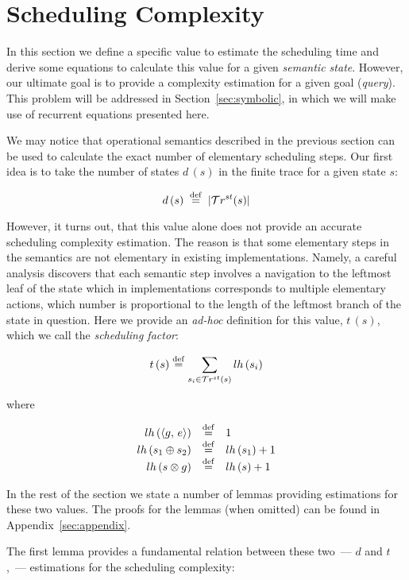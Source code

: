 \section{Scheduling Complexity}
\label{sec:scheduling}

In this section we define a specific value to estimate the scheduling time and derive some equations to calculate this value for a given \emph{semantic
state}. However, our ultimate goal is to provide a complexity estimation for a given goal (\emph{query}). This problem will be addressed in Section~\ref{sec:symbolic},
in which we will make use of recurrent equations presented here.

We may notice that operational semantics described in the previous section can be used to calculate the exact number of elementary scheduling steps.
Our first idea is to take the number of states $d\,(s)$ in the finite trace for a given state $s$:

\[ d\,(s) \; \overset{\mathrm{def}}{=} \; | \mathcal{T}r^{st}(s) |  \]

However, it turns out, that this value alone does not provide an accurate scheduling complexity estimation. The reason is that some
elementary steps in the semantics are not elementary in existing implementations. Namely, a careful analysis discovers that
each semantic step involves a navigation to the leftmost leaf of the state which in implementations corresponds to multiple elementary actions,
which number is proportional to the length of the leftmost branch of the state in question. Here we provide an \emph{ad-hoc} definition for this value, $t\,(s)$,
which we call the \emph{scheduling factor}:

\[
t\,(s) \overset{\mathrm{def}}{=} \sum\limits_{s_i \in \mathcal{T}r^{st}(s)} lh\,(s_i) 
\]

where

\[
\begin{array}{rcl}
 lh\,(\langle g ,\, e \rangle)  &\overset{\mathrm{def}}{=}& 1 \\
 lh\,(s_1 \oplus s_2) &\overset{\mathrm{def}}{=}& lh\,(s_1) + 1 \\
 lh\,(s \otimes g)    &\overset{\mathrm{def}}{=}& lh\,(s) + 1 \\
\end{array}
\]

In the rest of the section we state a number of lemmas providing estimations for these two values. The proofs for the lemmas (when omitted) can be
found in Appendix~\ref{sec:appendix}.

The first lemma provides a fundamental relation between these two~--- $d$ and $t$,~--- estimations for the scheduling complexity:

